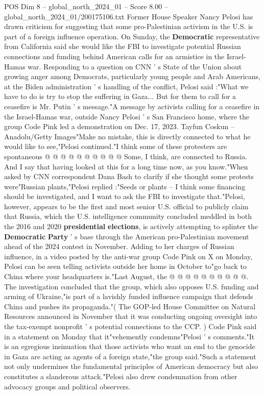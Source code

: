 \begin{textsample}{POS Dim 8 – global\_north\_2024\_01 – Score 8.00 – global\_north\_2024\_01/200175106.txt}  \label{ex:f8_pos_185}
Former House Speaker Nancy Pelosi has drawn criticism for suggesting that some pro-Palestinian activism in the U.S. is part of a foreign influence operation.
On Sunday, the \textbf{Democratic} representative from California said she would like the FBI to investigate potential Russian connections and funding behind American calls for an armistice in the Israel-Hamas war.
Responding to a question on CNN ' s State of the Union about growing anger among Democrats, particularly young people and Arab Americans, at the Biden administration ' s handling of the conflict, Pelosi said :"What we have to do is try to stop the suffering in Gaza...
But for them to call for a ceasefire is Mr.
Putin ' s message."A message by activists calling for a ceasefire in the Israel-Hamas war, outside Nancy Pelosi ' s San Francisco home, where the group Code Pink led a demonstration on Dec. 17, 2023.
Tayfun Coskun -- Anadolu/Getty Images"Make no mistake, this is directly connected to what he would like to see,"Pelosi continued."I think some of these protesters are spontaneous @ @ @ @ @ @ @ @ @ @ Some, I think, are connected to Russia.
And I say that having looked at this for a long time now, as you know."When asked by CNN correspondent Dana Bash to clarify if she thought some protests were"Russian plants,"Pelosi replied :"Seeds or plants -- I think some financing should be investigated, and I want to ask the FBI to investigate that."Pelosi, however, appears to be the first and most senior U.S. official to publicly claim that Russia, which the U.S. intelligence community concluded meddled in both the 2016 and 2020 \textbf{presidential} \textbf{elections}, is actively attempting to splinter the \textbf{Democratic} \textbf{Party} ' s base through the American pro-Palestinian movement ahead of the 2024 contest in November.
Adding to her charges of Russian influence, in a video posted by the anti-war group Code Pink on X on Monday, Pelosi can be seen telling activists outside her home in October to"go back to China where your headquarters is."Last August, the @ @ @ @ @ @ @ @ @ @.
The investigation concluded that the group, which also opposes U.S. funding and arming of Ukraine,"is part of a lavishly funded influence campaign that defends China and pushes its propaganda."( The GOP-led House Committee on Natural Resources announced in November that it was conducting ongoing oversight into the tax-exempt nonprofit ' s potential connections to the CCP. ) Code Pink said in a statement on Monday that it"vehemently condemns"Pelosi ' s comments."It is an egregious insinuation that those activists who want an end to the genocide in Gaza are acting as agents of a foreign state,"the group said."Such a statement not only undermines the fundamental principles of American democracy but also constitutes a slanderous attack."Pelosi also drew condemnation from other advocacy groups and political observers.

\end{textsample}
